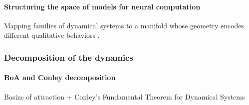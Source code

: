 \documentclass{article}
\theoremstyle{definition} \newtheorem{definition}{Definition}  \newtheorem{example}{Example}
\theoremstyle{remark} \newtheorem{remark}{Remark}
\newcounter{ct}
\begin{document}

 \paragraph{Structuring the space of models for neural computation} %
Mapping families of dynamical systems to a manifold whose geometry encodes different qualitative behaviors \citep{transtrum2014model, ricci2022phase2vec, quinn2022information, Vermani2024b}.

\subsubsection{Decomposition of the dynamics}\label{sec:decomposition}
\paragraph{BoA and Conley decomposition} Basins of attraction + Conley’s Fundamental Theorem for Dynamical Systems \citep{conley1978morse, norton1995fundamental,mischaikow1999cit}
\end{document}
